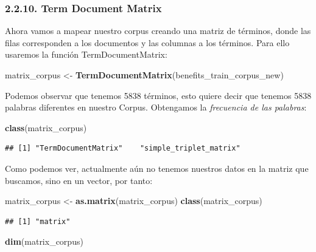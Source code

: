 \documentclass[spanish,]{article}
\newenvironment{Shaded}{\begin{snugshade}}{\end{snugshade}}
\newcommand{\KeywordTok}[1]{\textcolor[rgb]{0.13,0.29,0.53}{\textbf{#1}}}
\newcommand{\StringTok}[1]{\textcolor[rgb]{0.31,0.60,0.02}{#1}}
\newcommand{\NormalTok}[1]{#1}
\begin{document}
\subsubsection{2.2.10. Term Document Matrix}\label{term-document-matrix}

Ahora vamos a mapear nuestro corpus creando una matriz de términos,
donde las filas corresponden a los documentos y las columnas a los
términos. Para ello usaremos la función TermDocumentMatrix:

\begin{Shaded}
\begin{Highlighting}[]
\NormalTok{matrix_corpus <-}\StringTok{ }\KeywordTok{TermDocumentMatrix}\NormalTok{(benefits_train_corpus_new)}
\end{Highlighting}
\end{Shaded}

Podemos observar que tenemos 5838 términos, esto quiere decir que
tenemos 5838 palabras diferentes en nuestro Corpus. Obtengamos la
\emph{frecuencia de las palabras}:

\begin{Shaded}
\begin{Highlighting}[]
\KeywordTok{class}\NormalTok{(matrix_corpus)}
\end{Highlighting}
\end{Shaded}

\begin{verbatim}
## [1] "TermDocumentMatrix"    "simple_triplet_matrix"
\end{verbatim}

Como podemos ver, actualmente aún no tenemos nuestros datos en la matriz
que buscamos, sino en un vector, por tanto:

\begin{Shaded}
\begin{Highlighting}[]
\NormalTok{matrix_corpus <-}\StringTok{ }\KeywordTok{as.matrix}\NormalTok{(matrix_corpus)}
\KeywordTok{class}\NormalTok{(matrix_corpus)}
\end{Highlighting}
\end{Shaded}

\begin{verbatim}
## [1] "matrix"
\end{verbatim}

\begin{Shaded}
\begin{Highlighting}[]
\KeywordTok{dim}\NormalTok{(matrix_corpus) }
\end{Highlighting}
\end{Shaded}
\end{document}
